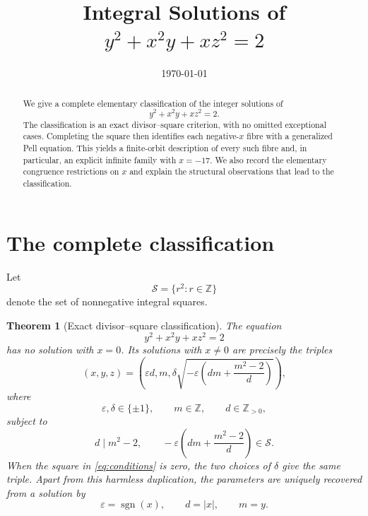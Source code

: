 \documentclass[11pt]{article}
\title{Integral Solutions of \texorpdfstring{$y^2+x^2y+xz^2=2$}{y2+x2y+xz2=2}}
\author{}
\date{\today}
\newtheorem{theorem}{Theorem}[section]
\theoremstyle{remark}
\newcommand{\Z}{\mathbb Z}
\newcommand{\Sq}{\mathcal S}
\begin{document}
\maketitle

\begin{abstract}
We give a complete elementary classification of the integer solutions of
\[
 y^2+x^2y+xz^2=2.
\]
The classification is an exact divisor--square criterion, with no omitted exceptional cases.  Completing the square then identifies each negative-$x$ fibre with a generalized Pell equation.  This yields a finite-orbit description of every such fibre and, in particular, an explicit infinite family with $x=-17$.  We also record the elementary congruence restrictions on $x$ and explain the structural observations that lead to the classification.
\end{abstract}

\section{The complete classification}

Let
\[
 \Sq=\{r^2:r\in\Z\}
\]
denote the set of nonnegative integral squares.

\begin{theorem}[Exact divisor--square classification]\label{thm:main}
The equation
\begin{equation}\label{eq:original}
 y^2+x^2y+xz^2=2
\end{equation}
has no solution with $x=0$.  Its solutions with $x\ne0$ are precisely the triples
\begin{equation}\label{eq:unified-param}
 (x,y,z)=
 \left(
   \varepsilon d,
   m,
   \delta\sqrt{-\varepsilon\left(dm+\frac{m^2-2}{d}\right)}
 \right),
\end{equation}
where
\[
 \varepsilon,\delta\in\{\pm1\},\qquad m\in\Z,\qquad d\in\Z_{>0},
\]
subject to
\begin{equation}\label{eq:conditions}
 d\mid m^2-2,
 \qquad
 -\varepsilon\left(dm+\frac{m^2-2}{d}\right)\in\Sq.
\end{equation}
When the square in \eqref{eq:conditions} is zero, the two choices of $\delta$ give the same triple.  Apart from this harmless duplication, the parameters are uniquely recovered from a solution by
\[
 \varepsilon=\operatorname{sgn}(x),\qquad d=|x|,
 \qquad m=y.
\]
\end{theorem}
\end{document}
